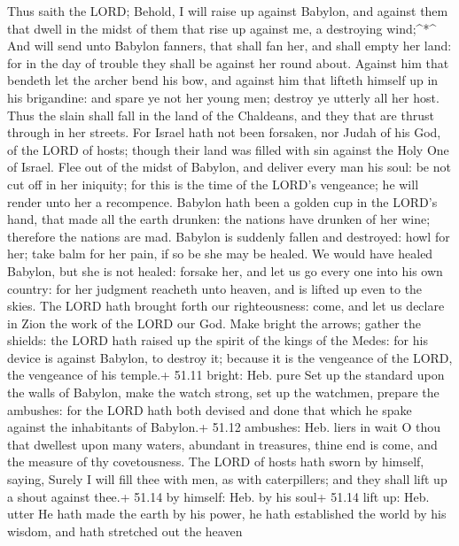  Thus saith the LORD; Behold, I will raise up against
Babylon, and against them that dwell in the midst of them that rise up
against me, a destroying wind;\^{}*\^{}  And will send unto
Babylon fanners, that shall fan her, and shall empty her land: for in
the day of trouble they shall be against her round about. 
Against him that bendeth let the archer bend his bow, and against him
that lifteth himself up in his brigandine: and spare ye not her young
men; destroy ye utterly all her host.  Thus the slain shall
fall in the land of the Chaldeans, and they that are thrust through in
her streets.  For Israel hath not been forsaken, nor Judah
of his God, of the LORD of hosts; though their land was filled with sin
against the Holy One of Israel.  Flee out of the midst of
Babylon, and deliver every man his soul: be not cut off in her iniquity;
for this is the time of the LORD's vengeance; he will render unto her a
recompence.  Babylon hath been a golden cup in the LORD's
hand, that made all the earth drunken: the nations have drunken of her
wine; therefore the nations are mad.  Babylon is suddenly
fallen and destroyed: howl for her; take balm for her pain, if so be she
may be healed.  We would have healed Babylon, but she is not
healed: forsake her, and let us go every one into his own country: for
her judgment reacheth unto heaven, and is lifted up even to the skies.
 The LORD hath brought forth our righteousness: come, and
let us declare in Zion the work of the LORD our God.  Make
bright the arrows; gather the shields: the LORD hath raised up the
spirit of the kings of the Medes: for his device is against Babylon, to
destroy it; because it is the vengeance of the LORD, the vengeance of
his temple.+ 51.11 bright: Heb. pure  Set up the standard
upon the walls of Babylon, make the watch strong, set up the watchmen,
prepare the ambushes: for the LORD hath both devised and done that which
he spake against the inhabitants of Babylon.+ 51.12 ambushes: Heb. liers
in wait  O thou that dwellest upon many waters, abundant in
treasures, thine end is come, and the measure of thy covetousness.
 The LORD of hosts hath sworn by himself, saying, Surely I
will fill thee with men, as with caterpillers; and they shall lift up a
shout against thee.+ 51.14 by himself: Heb. by his soul+ 51.14 lift up:
Heb. utter  He hath made the earth by his power, he hath
established the world by his wisdom, and hath stretched out the heaven
